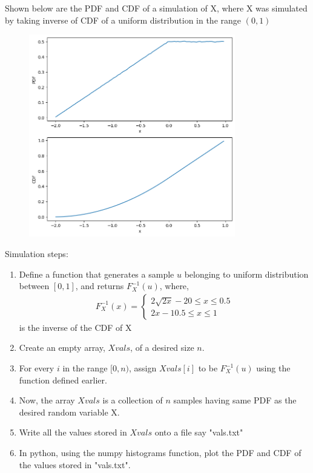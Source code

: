 \documentclass[]{article}
\begin{document}
Shown below are the PDF and CDF of a simulation of X, where X was simulated by taking inverse of CDF of a uniform distribution in the range $(0, 1)$
\begin{figure}[h]
    \centering
    \includegraphics[width=9cm]{./figs/z.png}
    \caption{}
    \label{fig:64ec/2022}
\end{figure}

Simulation steps:
\begin{enumerate}
    \item Define a function that generates a sample $u$ belonging to uniform distribution between $[0,1]$, and returns $F_X^{-1}(u)$, where, 
        \begin{align}
            F_X^{-1}(x)=	
			\begin{cases}
				2\sqrt{2x}-2  0\leq x \leq 0.5\\
				2x-1 0.5\leq x \leq 1
			\end{cases}	
        \end{align}
        is the inverse of the CDF of X
    \item Create an empty array, $Xvals$, of a desired size $n$.
    \item For every $i$ in the range $[0, n)$, assign $Xvals[i]$ to be $F_X^{-1}(u)$ using the function defined earlier.
    \item Now, the array $Xvals$ is a collection of $n$ samples having same PDF as the desired random variable X.
    \item Write all the values stored in $Xvals$ onto a file say "vals.txt" 
    \item In python, using the numpy histograms function, plot the PDF and CDF of the values stored in "vals.txt".
\end{enumerate}
\end{document}
